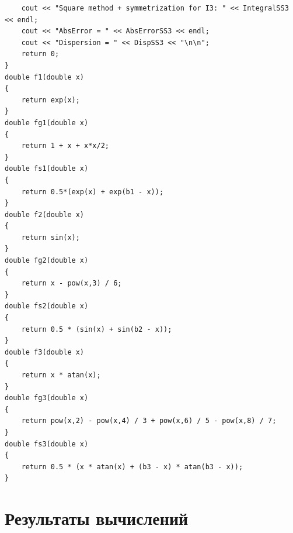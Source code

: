\documentclass[
11pt,
master, %
subf, %
href, %
colorlinks=true, %
times, %
]{disser}
\begin{document}
{\begin{verbatim}
    cout << "Square method + symmetrization for I3: " << IntegralSS3 << endl;
    cout << "AbsError = " << AbsErrorSS3 << endl;
    cout << "Dispersion = " << DispSS3 << "\n\n";
    return 0;
}
double f1(double x)
{
    return exp(x);
}
double fg1(double x)
{
    return 1 + x + x*x/2;
}
double fs1(double x)
{
    return 0.5*(exp(x) + exp(b1 - x));
}
double f2(double x)
{
    return sin(x);
}
double fg2(double x)
{
    return x - pow(x,3) / 6;
}
double fs2(double x)
{
    return 0.5 * (sin(x) + sin(b2 - x));
}
double f3(double x)
{
    return x * atan(x);
}
double fg3(double x)
{
    return pow(x,2) - pow(x,4) / 3 + pow(x,6) / 5 - pow(x,8) / 7;
}
double fs3(double x)
{
    return 0.5 * (x * atan(x) + (b3 - x) * atan(b3 - x));
}
\end{verbatim}
}

\newpage
\section{Результаты вычислений}
\end{document}
